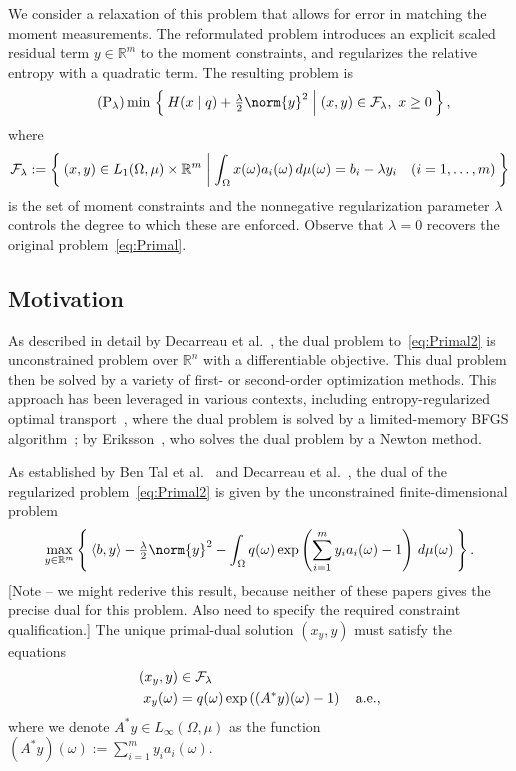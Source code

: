 \documentclass[10pt,a4paper]{article}
\numberwithin{equation}{section}
\theoremstyle{definition}
\def\rr{{\mathbb R}}
\def\cF{{\cal F}}
\newcommand{\ip}[1]{\langle#1\rangle}
\begin{document}
We consider a relaxation of this problem that allows for error in matching the moment measurements. The reformulated problem introduces an explicit scaled residual term $y\in\rr^m$ to the moment constraints, and regularizes the relative entropy with a quadratic term. The resulting problem is
\begin{equation}\label{eq:Primal2}
    \tag{P$_\lambda$}
    \min\, \Set{ H(x \mid q) + \tfrac{\lambda}{2}\norm{y}^2 | (x,y)\in\cF_\lambda,\ x\ge0},
\end{equation}
where
\begin{equation}\label{eq:FeasibleSet}
    \cF_\lambda := \Set{ (x,y)\in L_1( \Omega, \mu)\times\rr^m | \int_\Omega x(\omega)a_i(\omega)\,d\mu(\omega) = b_i - \lambda y_i \quad (i=1,\dots,m) }
\end{equation}
is the set of moment constraints and the nonnegative regularization parameter $\lambda$ controls the degree to which these are enforced. Observe that $\lambda=0$ recovers the original problem~\eqref{eq:Primal}.

\subsection{Motivation}

As described in detail by Decarreau et al.~\cite{decarreau_DualMethodsEntropy_1992}, the dual problem to~\eqref{eq:Primal2} is unconstrained problem over $\rr^n$ with a differentiable objective. This dual problem then be solved by a variety of first- or second-order optimization methods. This approach has been leveraged in various contexts, including entropy-regularized optimal transport~\cite{cuturi_SemidualRegularizedOptimal_2018}, where the dual problem is solved by a limited-memory BFGS algorithm~\cite{liu_LimitedMemoryBFGS_1989}; by Eriksson~\cite{eriksson_NoteSolutionLarge_1980}, who solves the dual problem by a Newton method. 

As established by Ben Tal et al.~\cite{ben-tal_RoleDualityOptimization_1988} and Decarreau et al.~\cite{decarreau_DualMethodsEntropy_1992}, the dual of the regularized problem~\eqref{eq:Primal2} is given by the unconstrained finite-dimensional problem
\begin{equation}\label{eq:Dual}
    \max_{y\in\rr^m} \Set{ \ip{b,y} - \tfrac{\lambda}{2}\norm{y}^2 - \int_\Omega q(\omega)\exp\left(\sum_{i=1}^m y_i a_i(\omega)-1\right) \,d\mu(\omega) }.
\end{equation}
[Note -- we might rederive this result, because neither of these papers gives the precise dual for this problem. Also need to specify the required constraint qualification.] The unique primal-dual solution $(x_y, y)$ must satisfy the equations
\begin{subequations}
\begin{align}\label{eq:PrimalDualMap}
   (x_y, y) &\in \cF_\lambda\\ 
    x_y(\omega) &= q(\omega)\exp\left((A^*y)(\omega)-1\right) \quad \mbox{a.e.,}
\end{align}
\end{subequations}
where we denote $A^*y\in L_\infty(\Omega,\mu)$ as the function $(A^*y)(\omega) := \sum_{i=1}^m y_i a_i(\omega)$.
\end{document}
